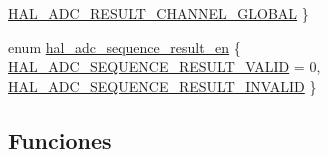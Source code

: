 \begin{DoxyCompactItemize}
\newline
\hyperlink{group__ADC_gga99371f47be5b6b4b61c32a1ea86f2b6ca5745789eb64375e74e6046b035e92b67}{H\+A\+L\+\_\+\+A\+D\+C\+\_\+\+R\+E\+S\+U\+L\+T\+\_\+\+C\+H\+A\+N\+N\+E\+L\+\_\+\+G\+L\+O\+B\+AL}
 \}
\item 
enum \hyperlink{group__ADC_ga7761986f9c56b809bce1299c6c32eddd}{hal\+\_\+adc\+\_\+sequence\+\_\+result\+\_\+en} \{ \hyperlink{group__ADC_gga7761986f9c56b809bce1299c6c32eddda0c93ff0a1c4ed09ad4b9e1443c4f329f}{H\+A\+L\+\_\+\+A\+D\+C\+\_\+\+S\+E\+Q\+U\+E\+N\+C\+E\+\_\+\+R\+E\+S\+U\+L\+T\+\_\+\+V\+A\+L\+ID} = 0, 
\hyperlink{group__ADC_gga7761986f9c56b809bce1299c6c32edddaec35d0357a3d36bc2c2789d2d45a994e}{H\+A\+L\+\_\+\+A\+D\+C\+\_\+\+S\+E\+Q\+U\+E\+N\+C\+E\+\_\+\+R\+E\+S\+U\+L\+T\+\_\+\+I\+N\+V\+A\+L\+ID}
 \}
\end{DoxyCompactItemize}
\subsection*{Funciones}
